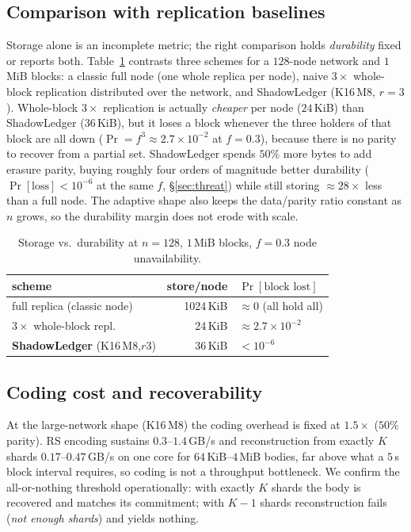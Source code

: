 \subsection{Comparison with replication baselines}
Storage alone is an incomplete metric; the right comparison holds \emph{durability} fixed or
reports both. Table~\ref{tab:baseline} contrasts three schemes for a $128$-node network and
$1$\,MiB blocks: a classic full node (one whole replica per node), naive $3\times$ whole-block
replication distributed over the network, and ShadowLedger (K16\,M8, $r{=}3$). Whole-block
$3\times$ replication is actually \emph{cheaper} per node ($24$\,KiB) than ShadowLedger
($36$\,KiB), but it loses a block whenever the three holders of that block are all down
($\Pr=f^3\approx2.7\times10^{-2}$ at $f{=}0.3$), because there is no parity to recover from a
partial set. ShadowLedger spends $50\%$ more bytes to add erasure parity, buying roughly four
orders of magnitude better durability ($\Pr[\text{loss}]<10^{-6}$ at the same $f$,
\S\ref{sec:threat}) while still storing $\approx28\times$ less than a full node. The adaptive
shape also keeps the data/parity ratio constant as $n$ grows, so the durability margin does not
erode with scale.

\begin{table}[t]
\centering
\caption{Storage vs.\ durability at $n{=}128$, $1$\,MiB blocks, $f{=}0.3$ node unavailability.}
\label{tab:baseline}
\small
\begin{tabular}{lrl}
\toprule
scheme & store/node & $\Pr[\text{block lost}]$ \\
\midrule
full replica (classic node)   & 1024\,KiB & $\approx 0$ (all hold all) \\
$3\times$ whole-block repl.    & 24\,KiB   & $\approx 2.7\times10^{-2}$ \\
\textbf{ShadowLedger} (K16\,M8,$r3$) & 36\,KiB & $<10^{-6}$ \\
\bottomrule
\end{tabular}
\end{table}

\subsection{Coding cost and recoverability}
At the large-network shape (K16\,M8) the coding overhead is fixed at $1.5\times$ ($50\%$ parity).
RS encoding sustains $0.3$--$1.4$\,GB/s and reconstruction from exactly $K$ shards
$0.17$--$0.47$\,GB/s on one core for $64$\,KiB--$4$\,MiB bodies, far above what a $5$\,s block
interval requires, so coding is not a throughput bottleneck. We confirm the all-or-nothing
threshold operationally: with exactly $K$ shards the body is recovered and matches its
commitment; with $K{-}1$ shards reconstruction fails (\emph{not enough shards}) and yields
nothing.

